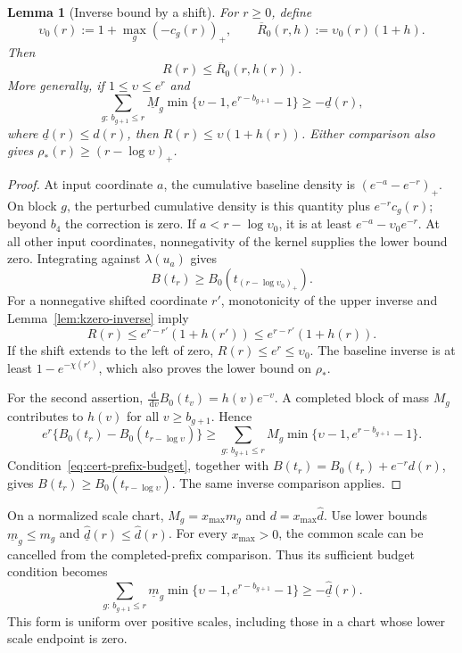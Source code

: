 \documentclass[11pt]{article}
\newtheorem{lemma}[theorem]{Lemma}
\theoremstyle{definition}
\theoremstyle{remark}
\newcommand{\dd}{\,\mathrm d}
\begin{document}
\begin{lemma}[Inverse bound by a shift]
\label{lem:cert-shift}
For $r\ge0$, define
\[
 \upsilon_0(r):=1+\max_g(-c_g(r))_+,
 \qquad
 \overline R_0(r,h):=\upsilon_0(r)(1+h).
\]
Then
\begin{equation}\label{eq:cert-shift-bound}
 R(r)\le\overline R_0(r,h(r)).
\end{equation}
More generally, if $1\le\upsilon\le e^r$ and
\begin{equation}\label{eq:cert-prefix-budget}
 \sum_{g:\,b_{g+1}\le r}\underline M_g
 \min\{\upsilon-1,e^{r-b_{g+1}}-1\}
 \ge-\underline d(r),
\end{equation}
where $\underline d(r)\le d(r)$, then
$
 R(r)\le\upsilon(1+h(r))$.
Either comparison also gives
$
 \rho_*(r)\ge(r-\log\upsilon)_+$.
\end{lemma}
\begin{proof}
At input coordinate $a$, the cumulative baseline density is
$(e^{-a}-e^{-r})_+$.  On block $g$, the perturbed cumulative density is
this quantity plus $e^{-r}c_g(r)$; beyond $b_4$ the correction
is zero.  If $a<r-\log\upsilon_0$, it is at least
$e^{-a}-\upsilon_0e^{-r}$.
At all other input coordinates, nonnegativity of the kernel supplies the
lower bound zero.  Integrating against $\lambda(u_a)$ gives
\[
 B(t_r)\ge B_0(t_{(r-\log\upsilon_0)_+}).
\]
For a nonnegative shifted coordinate $r'$, monotonicity of the upper inverse
and Lemma~\ref{lem:kzero-inverse} imply
\[
 R(r)\le e^{r-r'}(1+h(r'))\le e^{r-r'}(1+h(r)).
\]
If the shift extends to the left of zero, $R(r)\le e^r\le\upsilon_0$.
The baseline inverse is at least $1-e^{-\chi(r')}$, which also proves the
lower bound on $\rho_*$.

For the second assertion,
$\frac{\dd}{\dd v}B_0(t_v)=h(v)e^{-v}$.  A completed block of mass
$M_g$ contributes to $h(v)$ for all $v\ge b_{g+1}$.  Hence
\[
 e^r\{B_0(t_r)-B_0(t_{r-\log\upsilon})\}
 \ge\sum_{g:\,b_{g+1}\le r}M_g
       \min\{\upsilon-1,e^{r-b_{g+1}}-1\}.
\]
Condition~\eqref{eq:cert-prefix-budget}, together with
$B(t_r)=B_0(t_r)+e^{-r}d(r)$, gives $B(t_r)\ge B_0(t_{r-\log\upsilon})$.
The same inverse comparison applies.
\end{proof}

On a normalized scale chart, $M_g=x_{\max}m_g$ and
$d=x_{\max}\hat d$.  Use lower bounds $\underline m_g\le m_g$ and
$\underline{\hat d}(r)\le\hat d(r)$.  For every $x_{\max}>0$, the common scale can be
cancelled from the completed-prefix comparison.  Thus its sufficient
budget condition becomes
\[
 \sum_{g:\,b_{g+1}\le r}\underline m_g
 \min\{\upsilon-1,e^{r-b_{g+1}}-1\}
 \ge-\underline{\hat d}(r).
\]
This form is uniform over positive scales, including those in a chart
whose lower scale endpoint is zero.
\end{document}
